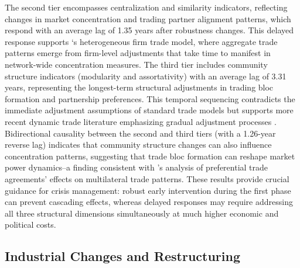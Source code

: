 \documentclass[preprint, 3p,
authoryear]{elsarticle} %
\begin{document}
The second tier encompasses centralization and similarity indicators,
reflecting changes in market concentration and trading partner alignment
patterns, which respond with an average lag of 1.35 years after
robustness changes. This delayed response supports
\citet{melitz2003impact}`s heterogeneous firm trade model, where
aggregate trade patterns emerge from firm-level adjustments that take
time to manifest in network-wide concentration measures. The third tier
includes community structure indicators (modularity and assortativity)
with an average lag of 3.31 years, representing the longest-term
structural adjustments in trading bloc formation and partnership
preferences. This temporal sequencing contradicts the immediate
adjustment assumptions of standard trade models
\citep{krugman1980scale, mansouri2022brief} but supports more recent
dynamic trade literature emphasizing gradual adjustment processes
\citep{eaton2016trade, atsebi2024sectoral}. Bidirectional causality
between the second and third tiers (with a 1.26-year reverse lag)
indicates that community structure changes can also influence
concentration patterns, suggesting that trade bloc formation can reshape
market power dynamics--a finding consistent with
\citet{hofmann2019content}'s analysis of preferential trade agreements'
effects on multilateral trade patterns. These results provide crucial
guidance for crisis management: robust early intervention during the
first phase can prevent cascading effects, whereas delayed responses may
require addressing all three structural dimensions simultaneously at
much higher economic and political costs.

\subsection{Industrial Changes and
Restructuring}\label{industrial-changes-and-restructuring}
\end{document}

